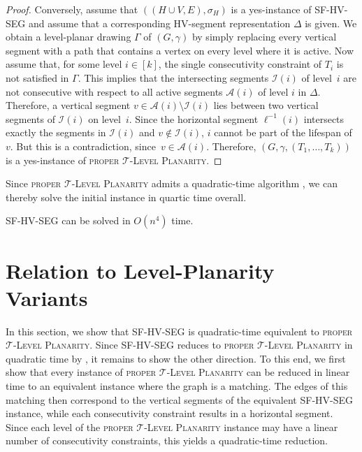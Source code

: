 \documentclass[runningheads]{llncs}
\newcommand{\tlp}{\textsc{proper $\mathcal T$-Level Planarity}\xspace}
\newcommand{\hvp}{\textsc{SF-HV-SEG}\xspace}
\begin{document}
\begin{proof}
  Conversely, assume that $((H \cup V, E), \sigma_H)$ is a yes-instance of \hvp and assume that a corresponding HV-segment representation $\Delta$ is given.
  We obtain a level-planar drawing $\Gamma$ of $(G, \gamma)$ by simply replacing every vertical segment with a path that contains a vertex on every level where it is active.
  Now assume that, for some level $i \in [k]$, the single consecutivity constraint of $T_i$ is not satisfied in $\Gamma$.
  This implies that the intersecting segments $\mathcal I(i)$ of level~$i$ are not consecutive with respect to all active segments $\mathcal A(i)$ of level $i$ in $\Delta$.
  Therefore, a vertical segment $v \in \mathcal A(i) \setminus \mathcal I(i)$ lies between two vertical segments of $\mathcal I(i)$ on level~$i$.
  Since the horizontal segment $\ell^{-1}(i)$ intersects exactly the segments in $\mathcal I(i)$ and $v \notin \mathcal I(i)$, $i$ cannot be part of the lifespan of $v$.
  But this is a contradiction, since~$v \in \mathcal A(i)$.
  Therefore, $(G, \gamma, (T_1, \dots, T_k))$ is a yes-instance of \tlp.
\end{proof}

Since \tlp admits a quadratic-time algorithm \cite{albfr-ibpcl-14,albfr-ibpcl-15}, we can thereby solve the initial instance in quartic time overall.

\begin{corollary}\label{cor:hvp-quartic}
  \hvp can be solved in $O(n^4)$ time.
\end{corollary}

\section{Relation to Level-Planarity Variants}\label{sec:hv-to-level}
In this section, we show that \hvp is quadratic-time equivalent to \tlp.
Since \hvp reduces to \tlp in quadratic time by , it remains to show the other direction.
To this end, we first show that every instance of \tlp can be reduced in linear time to an equivalent instance where the graph is a matching.
The edges of this matching then correspond to the vertical segments of the equivalent \hvp instance, while each consecutivity constraint results in a horizontal segment.
Since each level of the \tlp instance may have a linear number of consecutivity constraints, this yields a quadratic-time reduction.
\end{document}

